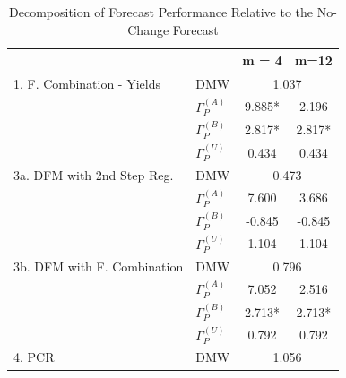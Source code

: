 \documentclass[11pt]{article}
\renewcommand{\baselinestretch}{1.5}
\begin{document}
\normalsize \clearpage
\renewcommand{\baselinestretch}{1} 
\begin{table} 
\caption{Decomposition of Forecast Performance Relative to the No-Change Forecast}                                                         
\center                                                                
\begin{tabular}{|l|l|c|c|}                                             
\hline                                                                 
&&m = 4&m=12 \\                                                        
\hline                                                                 
1. F. Combination - Yields          & DMW&\multicolumn{2}{|c|}{1.037}\\
\hline                                                                 
& $\Gamma_P^{(A)}$&9.885*&2.196\\                                      
& $\Gamma_P^{(B)}$&2.817*&2.817*\\                                     
& $\Gamma_P^{(U)}$&0.434&0.434\\                                       
\hline                                                                 
3a. DFM with 2nd Step Reg.          & DMW&\multicolumn{2}{|c|}{0.473}\\
\hline                                                                 
& $\Gamma_P^{(A)}$&7.600&3.686\\                                       
& $\Gamma_P^{(B)}$&-0.845&-0.845\\                                     
& $\Gamma_P^{(U)}$&1.104&1.104\\                                       
\hline                                                                 
3b. DFM with F. Combination         & DMW&\multicolumn{2}{|c|}{0.796}\\
\hline                                                                 
& $\Gamma_P^{(A)}$&7.052&2.516\\                                       
& $\Gamma_P^{(B)}$&2.713*&2.713*\\                                     
& $\Gamma_P^{(U)}$&0.792&0.792\\                                       
\hline                                                                 
4. PCR                              & DMW&\multicolumn{2}{|c|}{1.056}\\
\hline                                                                 

\end{tabular}
\end{table}
\end{document}
